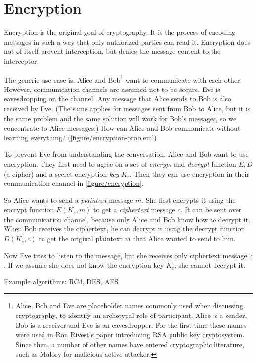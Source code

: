 \section{Encryption}
\label{toc/encryption}




Encryption is the original goal of cryptography. It is the process of encoding messages in such a way that only authorized parties can read it. Encryption does not of itself prevent interception, but denies the message content to the interceptor.

The generic use case is: Alice and Bob\footnote{Alice, Bob and Eve are placeholder names commonly used when discussing cryptography, to identify an archetypal role of participant. Alice is a sender, Bob is a receiver and Eve is an eavesdropper. For the first time these names were used in Ron Rivest's paper introducing RSA public key cryptosystem. \cite{rsa} Since then, a number of other names have entered cryptographic literature, such as Malory for malicious active attacker.} want to communicate with each other. However, communication channels are assumed not to be secure. Eve is eavesdropping on the channel. Any message that Alice sends to Bob is also received by Eve. (The same applies for messages sent from Bob to Alice, but it is the same problem and the same solution will work for Bob's messages, so we concentrate to Alice messages.) How can Alice and Bob communicate without learning everything? (\autoref{figure/encryption-problem}) \cite{ferguson2010cryptography}

To prevent Eve from understanding the conversation, Alice and Bob want to use encryption. They first need to agree on a set of \textit{encrypt} and \textit{decrypt} function $E, D$ (a cipher) and a secret encryption \textit{key} $K_e$. Then they can use encryption in their communication channel in \autoref{figure/encryption}.

So Alice wants to send a \textit{plaintext} message $m$. She first encrypts it using the encrypt function $E(K_e, m)$ to get a \textit{ciphertext} message $c$. It can be sent over the communication channel, because only Alice and Bob know how to decrypt it. When Bob receives the ciphertext, he can decrypt it using the decrypt function $D(K_e, c)$ to get the original plaintext $m$ that Alice wanted to send to him.

Now Eve tries to listen to the message, but she receives only ciphertext message $c$. If we assume she does not know the encryption key $K_e$, she cannot decrypt it.

Example algorithms: RC4, DES, AES
